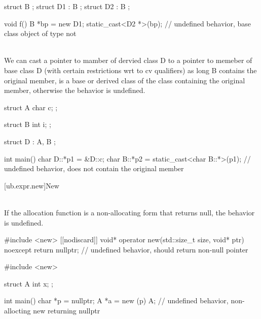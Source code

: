 \pnum
\begin{example}
\begin{codeblock}
struct B {};
struct D1 : B {};
struct D2 : B {};

void f() {
  B *bp = new D1;
  static_cast<D2 *>(bp);        // undefined behavior, base class object of type  not 
}
\end{codeblock}
\end{example}

\pnum
{} \\
We can cast a pointer to mamber of dervied class D to a pointer to memeber of base class D (with certain restrictions wrt to cv qualifiers)
as long B contains the original member, is a base or derived class of the class containing the original member, otherwise the behavior is undefined.


\pnum
\begin{example}
\begin{codeblock}
struct A {
  char c;
};

struct B {
  int i;
};

struct D : A, B {};

int main() {
  char D::*p1 = &D::c;
  char B::*p2 = static_cast<char B::*>(p1); // undefined behavior,  does not contain the original member 
}
\end{codeblock}
\end{example}


[ub.expr.new]{New}

\pnum
{} \\
If the allocation
function is a non-allocating form  that returns null, the behavior is undefined.

\pnum
\begin{example}
\begin{codeblock}
#include <new>
[[nodiscard]] void* operator new(std::size_t size, void* ptr) noexcept {
  return nullptr;       // undefined behavior,  should return non-null pointer
}
\end{codeblock}
\end{example}
\begin{example}
\begin{codeblock}
#include <new>

struct A {
  int x;
};

int main() {
  char *p = nullptr;
  A *a = new (p) A;     // undefined behavior, non-allocting new returning nullptr
}
\end{codeblock}
\end{example}



